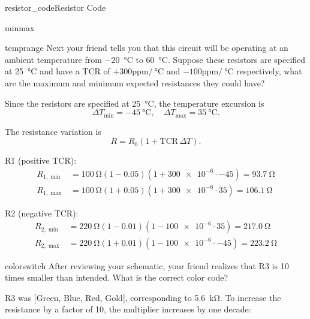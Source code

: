 \begin{mainquestion}{resistor_code}{Resistor Code}
\begin{partquestion}{minmax}
\begin{answer}
\end{answer}
\end{partquestion}

\begin{partquestion}{temprange}
{Next your friend tells you that this circuit will be operating at an ambient temperature from \qty{-20}{\celsius} to \qty{60}{\celsius}. Suppose these resistors are specified at \qty{25}{\celsius} and have a TCR of $+300\text{ppm}/\qty{}{\celsius}$ and $-100\text{ppm}/\qty{}{\celsius}$ respectively, what are the maximum and minimum expected resistances they could have?}

\begin{answer}

Since the resistors are specified at \qty{25}{\celsius}, the temperature excursion is
\[
\Delta T_{\min} = \qty{-45}{\celsius}, \quad
\Delta T_{\max} = \qty{35}{\celsius}.
\]

The resistance variation is
\[
R = R_0\left(1 + \mathrm{TCR}\,\Delta T\right).
\]

R1 (positive TCR):
\begin{align*}
R_{1,\min} &= \qty{100}{\ohm}\left(1-\num{0.05}\right)\left(1+\num{300e-6}\cdot\num{-45}\right)
= \qty{93.7}{\ohm} \\
R_{1,\max} &= \qty{100}{\ohm}\left(1+\num{0.05}\right)\left(1+\num{300e-6}\cdot\num{35}\right)
= \qty{106.1}{\ohm}
\end{align*}

R2 (negative TCR):
\begin{align*}
R_{2,\min} &= \qty{220}{\ohm}\left(1-\num{0.01}\right)\left(1-\num{100e-6}\cdot\num{35}\right)
= \qty{217.0}{\ohm} \\
R_{2,\max} &= \qty{220}{\ohm}\left(1+\num{0.01}\right)\left(1-\num{100e-6}\cdot\num{-45}\right)
= \qty{223.2}{\ohm}
\end{align*}

\end{answer}
\end{partquestion}

\begin{partquestion}{colorswitch}
{After reviewing your schematic, your friend realizes that R3 is 10 times smaller than intended. What is the correct color code?}

\begin{answer}
R3 was [Green, Blue, Red, Gold], corresponding to \qty{5.6}{\kilo\ohm}.  
To increase the resistance by a factor of 10, the multiplier increases by one decade:


\end{answer}
\end{partquestion}
\end{mainquestion}
